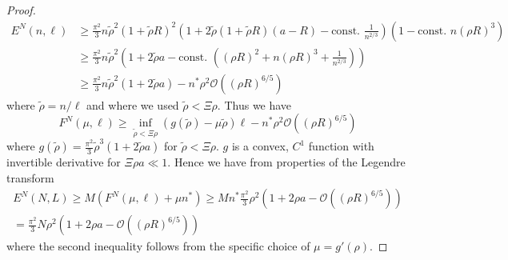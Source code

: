 \documentclass[a4paper,11pt]{article}
\numberwithin{equation}{section}
\begin{document}
\begin{proof}
\begin{equation}
\begin{aligned}
		E^{N}(n,\ell)&\geq\frac{\pi^2}{3}n\tilde{\rho}^2(1+\tilde{\rho} R)^2\left(1+2\tilde{\rho}(1+\tilde{\rho} R)(a-R)-\text{const. }\frac{1}{n^{2/3}}\right)\left(1-\text{const. }n(\rho R)^{3}\right)\\
		&\geq\frac{\pi^2}{3}n\tilde{\rho}^2\left(1+2\tilde{\rho}a-\text{const. }\left((\rho R)^2+n(\rho R)^3+\frac{1}{n^{2/3}}\right)\right)\\
		&\geq \frac{\pi^2}{3}n\tilde{\rho}^2\left(1+2\tilde{\rho}a\right)-n^*\rho^2\mathcal{O}\left((\rho R)^{6/5}\right)
		\end{aligned}
		\end{equation}
		where $ \tilde{\rho}=n/\ell $ and where we used $ \tilde{\rho}<\Xi\rho$.
		Thus we have \begin{equation}
		F^{N}(\mu,\ell)\geq \inf_{\tilde{\rho}<\Xi\rho}(g(\tilde{\rho})-\mu\tilde{\rho})\ell-n^\ast \rho^2 \mathcal{O}\left((\rho R)^{6/5}\right)
		\end{equation}
			where $
		g(\tilde{\rho})=
		\frac{\pi^2}{3}\tilde{\rho}^3\left(1+2\tilde{\rho}a\right)
		$ for $ \tilde{\rho}<\Xi\rho $. $ g $ is a convex, $ C^{1} $ function with invertible derivative for $ \Xi\rho a\ll 1  $. Hence we have from properties of the Legendre transform \begin{equation}
		\begin{aligned}
		E^{N}(N,L)\geq M(F^{N}(\mu,\ell)+\mu n^*)\geq Mn^\ast\frac{\pi^2}{3} \rho^2 \left(1+2\rho a-\mathcal{O}\left((\rho R)^{6/5}\right)\right)\\
		=\frac{\pi^2}{3} N\rho^2 \left(1+2\rho a-\mathcal{O}\left((\rho R)^{6/5}\right)\right)
		\end{aligned}
		\end{equation}
		where the second inequality follows from the specific choice of $ \mu=g'(\rho) $.
	\end{proof}
	
	
	
\end{document}
